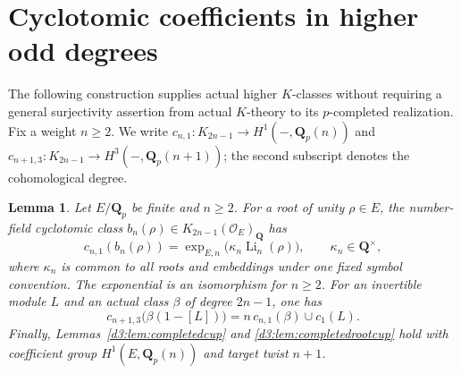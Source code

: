 \documentclass[11pt,a4paper]{amsart}
\numberwithin{equation}{section}
\newtheorem{lemma}[theorem]{Lemma}
\theoremstyle{definition}
\theoremstyle{remark}
\newcommand{\Q}{\mathbf Q}
\newcommand{\OO}{\mathcal O}
\begin{document}
\section{Cyclotomic coefficients in higher odd degrees}
\label{d3:sec:completedhigherodd}

The following construction supplies actual higher $K$-classes without
requiring a general surjectivity assertion from actual $K$-theory to
its $p$-completed realization. Fix a weight $n\geq2$. We write
$c_{n,1}:K_{2n-1}\to H^1(-,\Q_p(n))$ and
$c_{n+1,3}:K_{2n-1}\to H^3(-,\Q_p(n+1))$; the second subscript
denotes the cohomological degree.

\begin{lemma}
\label{d3:lem:highercoefficients}
Let $E/\Q_p$ be finite and $n\geq2$.
For a root of unity $\rho\in E$, the number-field cyclotomic class
$b_n(\rho)\in K_{2n-1}(\OO_E)_{\Q}$ has
\begin{equation}\label{d3:eq:highercyclotomicregulator}
 c_{n,1}(b_n(\rho))
 =\exp_{E,n}\bigl(\kappa_n\operatorname{Li}_n(\rho)\bigr),
 \qquad \kappa_n\in\Q^\times,
\end{equation}
where $\kappa_n$ is common to all roots and embeddings under one
fixed symbol convention. The exponential is an isomorphism for
$n\geq2$. For an invertible module $L$ and an actual class $\beta$
of degree $2n-1$, one has
\begin{equation}\label{d3:eq:higherlineproduct}
 c_{n+1,3}\bigl(\beta(1-[L])\bigr)
 =n\,c_{n,1}(\beta)\cup c_1(L).
\end{equation}
Finally, Lemmas~\ref{d3:lem:completedcup} and
\ref{d3:lem:completedrootcup} hold with coefficient group
$H^1(E,\Q_p(n))$ and target twist $n+1$.
\end{lemma}
\end{document}
